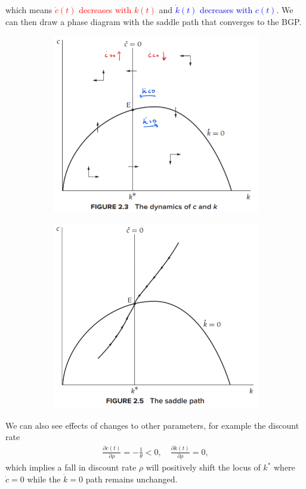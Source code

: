 \documentclass[../main.tex]{subfiles}
\begin{document}
        which means \textcolor{red}{$\dot c(t)$ decreases with $k(t)$} and \textcolor{blue}{$\dot k(t)$ decreases with $c(t)$}. We can then draw a phase diagram with the saddle path that converges to the BGP.
        \begin{figure}[!ht]
            \centering
            \begin{subfigure}
                \centering \includegraphics[width=0.45\linewidth]{subfile/attachments/2.1-dynamics of c and k.png}
            \end{subfigure}
            \begin{subfigure}
                \centering \includegraphics[width=0.45\linewidth]{subfile/attachments/2.2-saddle path.png}
            \end{subfigure}
        \end{figure}
        
        \vspace{0.5cm}
        
        We can also see effects of changes to other parameters, for example the discount rate
        \begin{align}
            \frac{\partial \dot c(t)}{\partial \rho} = -\frac{1}{\theta} < 0,
            \quad
            \frac{\partial \dot{k}(t)}{\partial \rho} = 0,
        \end{align}
        which implies a fall in discount rate $\rho$ will positively shift the locus of $k^*$ where $\dot c = 0$ while the $\dot k = 0$ path remains unchanged.
        
\end{document}

